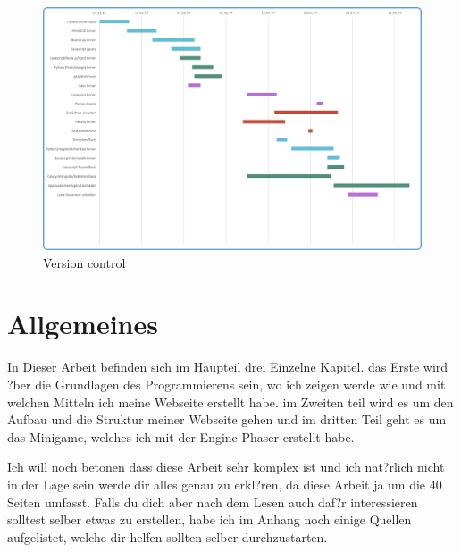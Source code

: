 \documentclass{article}
\begin{document}
\begin{figure}
    \centering
    \includegraphics[width=.8\linewidth]{gantt}
    \caption{Version control}
    \label{fig:sub1}
    \end{figure}





\cleardoublepage


\section{Allgemeines}
In Dieser Arbeit befinden sich im Haupteil drei Einzelne Kapitel.
das Erste wird ?ber die Grundlagen des Programmierens sein, wo ich zeigen werde wie und mit welchen Mitteln ich meine Webseite erstellt habe.
im Zweiten teil wird es um den Aufbau und die Struktur meiner Webseite gehen und im dritten Teil geht es um das Minigame,
welches ich mit der Engine Phaser erstellt habe.

Ich will noch betonen dass diese Arbeit sehr komplex ist und ich nat?rlich nicht in der Lage sein werde dir alles genau zu erkl?ren, da diese Arbeit ja
um die 40 Seiten umfasst. Falls du dich aber nach dem Lesen auch daf?r interessieren solltest selber etwas zu erstellen, habe ich im Anhang noch einige Quellen
aufgelistet, welche dir helfen sollten selber durchzustarten.
\end{document}
